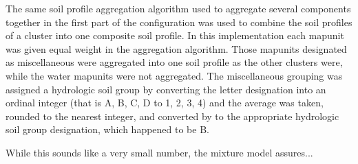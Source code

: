 The same soil profile aggregation algorithm \citep{beaudette_aqp_2013} used to aggregate several components together in the first part of the configuration was used to combine the soil profiles of a cluster into one composite soil profile. In this implementation each mapunit was given equal weight in the aggregation algorithm. Those mapunits designated as miscellaneous were aggregated into one soil profile as the other clusters were, while the water mapunits were not aggregated. The miscellaneous  grouping was assigned a hydrologic soil group by converting the letter designation into an ordinal integer (that is A, B, C, D to 1, 2, 3, 4) and the average was taken, rounded to the nearest integer, and converted by to the appropriate hydrologic soil group designation, which happened to be B. 

While this sounds like a very small number, the mixture model assures... 

